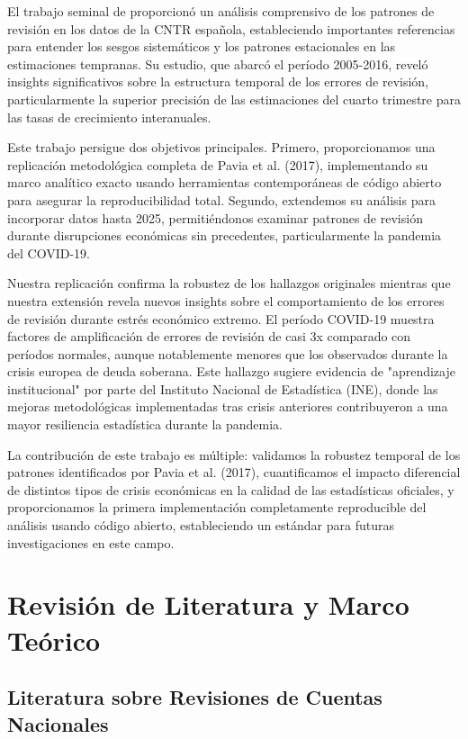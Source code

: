 \documentclass[12pt,a4paper]{article}
\begin{document}
El trabajo seminal de \citet{pavia2017} proporcionó un análisis comprensivo de los patrones de revisión en los datos de la CNTR española, estableciendo importantes referencias para entender los sesgos sistemáticos y los patrones estacionales en las estimaciones tempranas. Su estudio, que abarcó el período 2005-2016, reveló insights significativos sobre la estructura temporal de los errores de revisión, particularmente la superior precisión de las estimaciones del cuarto trimestre para las tasas de crecimiento interanuales.

Este trabajo persigue dos objetivos principales. Primero, proporcionamos una replicación metodológica completa de Pavia et al. (2017), implementando su marco analítico exacto usando herramientas contemporáneas de código abierto para asegurar la reproducibilidad total. Segundo, extendemos su análisis para incorporar datos hasta 2025, permitiéndonos examinar patrones de revisión durante disrupciones económicas sin precedentes, particularmente la pandemia del COVID-19.

Nuestra replicación confirma la robustez de los hallazgos originales mientras que nuestra extensión revela nuevos insights sobre el comportamiento de los errores de revisión durante estrés económico extremo. El período COVID-19 muestra factores de amplificación de errores de revisión de casi 3x comparado con períodos normales, aunque notablemente menores que los observados durante la crisis europea de deuda soberana. Este hallazgo sugiere evidencia de "aprendizaje institucional" por parte del Instituto Nacional de Estadística (INE), donde las mejoras metodológicas implementadas tras crisis anteriores contribuyeron a una mayor resiliencia estadística durante la pandemia.

La contribución de este trabajo es múltiple: validamos la robustez temporal de los patrones identificados por Pavia et al. (2017), cuantificamos el impacto diferencial de distintos tipos de crisis económicas en la calidad de las estadísticas oficiales, y proporcionamos la primera implementación completamente reproducible del análisis usando código abierto, estableciendo un estándar para futuras investigaciones en este campo.

\section{Revisión de Literatura y Marco Teórico}

\subsection{Literatura sobre Revisiones de Cuentas Nacionales}
\end{document}
